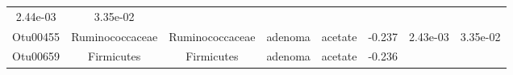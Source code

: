 \documentclass[11pt,]{article}
\begin{document}
\begin{longtable}[]{@{}cccccccc@{}}
\begin{minipage}[t]{0.08\columnwidth}
2.44e-03\strut
\end{minipage} & \begin{minipage}[t]{0.08\columnwidth}\centering\strut
3.35e-02\strut
\end{minipage}\tabularnewline
\begin{minipage}[t]{0.08\columnwidth}\centering\strut
Otu00455\strut
\end{minipage} & \begin{minipage}[t]{0.15\columnwidth}\centering\strut
Ruminococcaceae\strut
\end{minipage} & \begin{minipage}[t]{0.15\columnwidth}\centering\strut
Ruminococcaceae\strut
\end{minipage} & \begin{minipage}[t]{0.08\columnwidth}\centering\strut
adenoma\strut
\end{minipage} & \begin{minipage}[t]{0.09\columnwidth}\centering\strut
acetate\strut
\end{minipage} & \begin{minipage}[t]{0.07\columnwidth}\centering\strut
-0.237\strut
\end{minipage} & \begin{minipage}[t]{0.08\columnwidth}\centering\strut
2.43e-03\strut
\end{minipage} & \begin{minipage}[t]{0.08\columnwidth}\centering\strut
3.35e-02\strut
\end{minipage}\tabularnewline
\begin{minipage}[t]{0.08\columnwidth}\centering\strut
Otu00659\strut
\end{minipage} & \begin{minipage}[t]{0.15\columnwidth}\centering\strut
Firmicutes\strut
\end{minipage} & \begin{minipage}[t]{0.15\columnwidth}\centering\strut
Firmicutes\strut
\end{minipage} & \begin{minipage}[t]{0.08\columnwidth}\centering\strut
adenoma\strut
\end{minipage} & \begin{minipage}[t]{0.09\columnwidth}\centering\strut
acetate\strut
\end{minipage} & \begin{minipage}[t]{0.07\columnwidth}\centering\strut
-0.236\strut
\end{minipage} & \begin{minipage}[t]{0.08\columnwidth}\centering\strut

\end{minipage}
\end{longtable}
\end{document}
